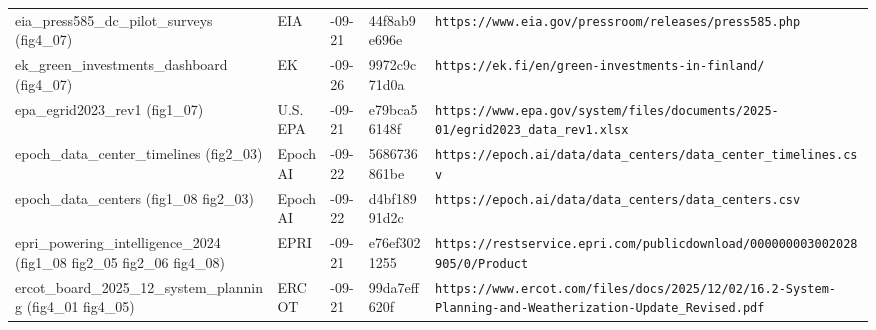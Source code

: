 \begin{longtable}{>{\raggedright\arraybackslash}p{3.0cm}>{\raggedright\arraybackslash}p{1.5cm}>{\raggedright\arraybackslash}p{1.4cm}>{\raggedright\arraybackslash}p{2.0cm}>{\raggedright\arraybackslash}p{6.0cm}}
eia\_\allowbreak{}press585\_\allowbreak{}dc\_\allowbreak{}pilot\_\allowbreak{}surveys (fig4\_\allowbreak{}07) & EIA & 2026-09-21 & 44f8ab9e696e & \texttt{https:\allowbreak{}/\allowbreak{}/\allowbreak{}www.\allowbreak{}eia.\allowbreak{}gov/\allowbreak{}pressroom/\allowbreak{}releases/\allowbreak{}press585.\allowbreak{}php} \\
ek\_\allowbreak{}green\_\allowbreak{}investments\_\allowbreak{}dashboard (fig4\_\allowbreak{}07) & EK & 2026-09-26 & 9972c9c71d0a & \texttt{https:\allowbreak{}/\allowbreak{}/\allowbreak{}ek.\allowbreak{}fi/\allowbreak{}en/\allowbreak{}green-\allowbreak{}investments-\allowbreak{}in-\allowbreak{}finland/\allowbreak{}} \\
epa\_\allowbreak{}egrid2023\_\allowbreak{}rev1 (fig1\_\allowbreak{}07) & U.\allowbreak{}S.\allowbreak{} EPA & 2026-09-21 & e79bca56148f & \texttt{https:\allowbreak{}/\allowbreak{}/\allowbreak{}www.\allowbreak{}epa.\allowbreak{}gov/\allowbreak{}system/\allowbreak{}files/\allowbreak{}documents/\allowbreak{}2025-\allowbreak{}01/\allowbreak{}egrid2023\_\allowbreak{}data\_\allowbreak{}rev1.\allowbreak{}xlsx} \\
epoch\_\allowbreak{}data\_\allowbreak{}center\_\allowbreak{}timelines (fig2\_\allowbreak{}03) & Epoch AI & 2026-09-22 & 5686736861be & \texttt{https:\allowbreak{}/\allowbreak{}/\allowbreak{}epoch.\allowbreak{}ai/\allowbreak{}data/\allowbreak{}data\_\allowbreak{}centers/\allowbreak{}data\_\allowbreak{}center\_\allowbreak{}timelines.\allowbreak{}csv} \\
epoch\_\allowbreak{}data\_\allowbreak{}centers (fig1\_\allowbreak{}08 fig2\_\allowbreak{}03) & Epoch AI & 2026-09-22 & d4bf18991d2c & \texttt{https:\allowbreak{}/\allowbreak{}/\allowbreak{}epoch.\allowbreak{}ai/\allowbreak{}data/\allowbreak{}data\_\allowbreak{}centers/\allowbreak{}data\_\allowbreak{}centers.\allowbreak{}csv} \\
epri\_\allowbreak{}powering\_\allowbreak{}intelligence\_\allowbreak{}2024 (fig1\_\allowbreak{}08 fig2\_\allowbreak{}05 fig2\_\allowbreak{}06 fig4\_\allowbreak{}08) & EPRI & 2026-09-21 & e76ef3021255 & \texttt{https:\allowbreak{}/\allowbreak{}/\allowbreak{}restservice.\allowbreak{}epri.\allowbreak{}com/\allowbreak{}publicdownload/\allowbreak{}000000003002028905/\allowbreak{}0/\allowbreak{}Product} \\
ercot\_\allowbreak{}board\_\allowbreak{}2025\_\allowbreak{}12\_\allowbreak{}system\_\allowbreak{}planning (fig4\_\allowbreak{}01 fig4\_\allowbreak{}05) & ERCOT & 2026-09-21 & 99da7eff620f & \texttt{https:\allowbreak{}/\allowbreak{}/\allowbreak{}www.\allowbreak{}ercot.\allowbreak{}com/\allowbreak{}files/\allowbreak{}docs/\allowbreak{}2025/\allowbreak{}12/\allowbreak{}02/\allowbreak{}16.\allowbreak{}2-\allowbreak{}System-\allowbreak{}Planning-\allowbreak{}and-\allowbreak{}Weatherization-\allowbreak{}Update\_\allowbreak{}Revised.\allowbreak{}pdf} \\

\end{longtable}
